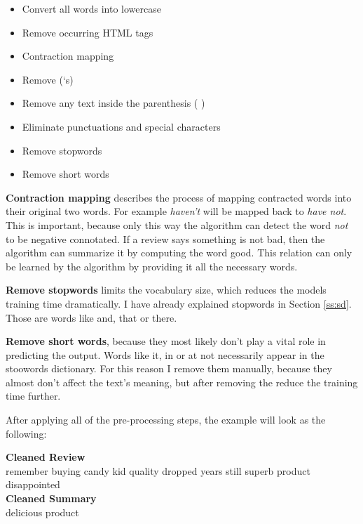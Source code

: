 \begin{tcolorbox}
	\begin{itemize}
		\item Convert all words into lowercase
		\item Remove occurring HTML tags
		\item Contraction mapping
		\item Remove (‘s)
		\item Remove any text inside the parenthesis ( )
		\item Eliminate punctuations and special characters
		\item Remove stopwords
		\item Remove short words
	\end{itemize}
\end{tcolorbox}

\textbf{Contraction mapping} describes the process of mapping contracted words into their original two words. For example \textit{haven't} will be mapped back to \textit{have not}. This is important, because only this way the algorithm can detect the word \textit{not} to be negative connotated. If a review says something is not bad, then the algorithm can summarize it by computing the word good. This relation can only be learned by the algorithm by providing it all the necessary words.

\textbf{Remove stopwords} limits the vocabulary size, which reduces the models training time dramatically. I have already explained stopwords in Section \ref{ss:sd}. Those are words like and, that or there. 

\textbf{Remove short words}, because they most likely don't play a vital role in predicting the output. Words like it, in or at not necessarily appear in the stoowords dictionary. For this reason I remove them manually, because they almost don't affect the text's meaning, but after removing the reduce the training time further. 

After applying all of the pre-processing steps, the example will look as the following:

\begin{tcolorbox}
	\textbf{Cleaned Review} \\
	remember buying candy kid quality dropped years still superb product disappointed \\
	
	\textbf{Cleaned Summary} \\
	delicious product
\end{tcolorbox}

